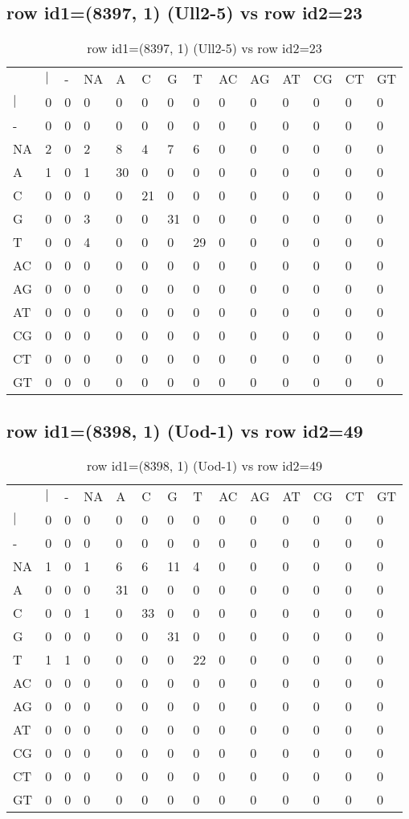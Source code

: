 \subsection{row id1=(8397, 1) (Ull2-5) vs row id2=23}
\begin{center}
\begin{longtable}{|l|l|l|l|l|l|l|l|l|l|l|l|l|l|}
\caption{row id1=(8397, 1) (Ull2-5) vs row id2=23} \label{table_dm462}\\
\hline
\\
\hline
&$|$&-&NA&A&C&G&T&AC&AG&AT&CG&CT&GT\\
$|$&0&0&0&0&0&0&0&0&0&0&0&0&0\\
-&0&0&0&0&0&0&0&0&0&0&0&0&0\\
NA&2&0&2&8&4&7&6&0&0&0&0&0&0\\
A&1&0&1&30&0&0&0&0&0&0&0&0&0\\
C&0&0&0&0&21&0&0&0&0&0&0&0&0\\
G&0&0&3&0&0&31&0&0&0&0&0&0&0\\
T&0&0&4&0&0&0&29&0&0&0&0&0&0\\
AC&0&0&0&0&0&0&0&0&0&0&0&0&0\\
AG&0&0&0&0&0&0&0&0&0&0&0&0&0\\
AT&0&0&0&0&0&0&0&0&0&0&0&0&0\\
CG&0&0&0&0&0&0&0&0&0&0&0&0&0\\
CT&0&0&0&0&0&0&0&0&0&0&0&0&0\\
GT&0&0&0&0&0&0&0&0&0&0&0&0&0\\
\hline
\end{longtable}
\end{center}

\subsection{row id1=(8398, 1) (Uod-1) vs row id2=49}
\begin{center}
\begin{longtable}{|l|l|l|l|l|l|l|l|l|l|l|l|l|l|}
\caption{row id1=(8398, 1) (Uod-1) vs row id2=49} \label{table_dm464}\\
\hline
\\
\hline
&$|$&-&NA&A&C&G&T&AC&AG&AT&CG&CT&GT\\
$|$&0&0&0&0&0&0&0&0&0&0&0&0&0\\
-&0&0&0&0&0&0&0&0&0&0&0&0&0\\
NA&1&0&1&6&6&11&4&0&0&0&0&0&0\\
A&0&0&0&31&0&0&0&0&0&0&0&0&0\\
C&0&0&1&0&33&0&0&0&0&0&0&0&0\\
G&0&0&0&0&0&31&0&0&0&0&0&0&0\\
T&1&1&0&0&0&0&22&0&0&0&0&0&0\\
AC&0&0&0&0&0&0&0&0&0&0&0&0&0\\
AG&0&0&0&0&0&0&0&0&0&0&0&0&0\\
AT&0&0&0&0&0&0&0&0&0&0&0&0&0\\
CG&0&0&0&0&0&0&0&0&0&0&0&0&0\\
CT&0&0&0&0&0&0&0&0&0&0&0&0&0\\
GT&0&0&0&0&0&0&0&0&0&0&0&0&0\\
\hline
\end{longtable}
\end{center}


